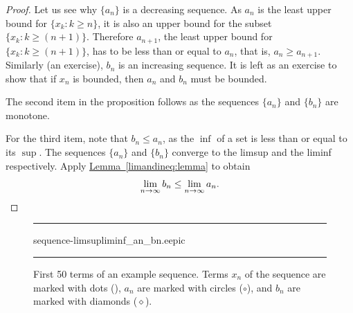 \documentclass[12pt]{book}
\newenvironment{myfigureht}{%
\begin{figure}[h!t]
\noindent\rule{\textwidth}{0.4pt}\vspace{12pt}\par\centering}%
{\par\noindent\rule{\textwidth}{0.4pt}
\end{figure}}
\newcommand{\N}{{\mathbb{N}}}
\theoremstyle{plain}
\theoremstyle{remark}
\theoremstyle{definition}
\theoremstyle{exercise}
\theoremstyle{example}
\newcommand{\lemmaref}[1]{\hyperref[#1]{Lemma~\ref*{#1}}}
\begin{document}
\begin{proof}
Let us see why $\{ a_n \}$ is a decreasing sequence.  As $a_n$ is the least upper
bound for $\{ x_k : k \geq n \}$, it is also
an upper bound for the subset $\{ x_k : k \geq (n+1) \}$.  Therefore
$a_{n+1}$, the least upper bound for
$\{ x_k : k \geq (n+1) \}$, has to be less than or equal to $a_n$,
that is,
$a_n \geq a_{n+1}$.  Similarly (an exercise), $b_n$ is an increasing
sequence.  It is left as an exercise to show that
if $x_n$ is bounded, then $a_n$ and $b_n$ must be bounded.

The second item in the proposition follows as the sequences
$\{ a_n \}$ and $\{ b_n \}$ are monotone.

For the third item, note that $b_n \leq a_n$, as the $\inf$ of a set
is less than or equal to its $\sup$.  The sequences $\{ a_n \}$ and $\{ b_n \}$
converge to the limsup and the liminf respectively.
Apply \lemmaref{limandineq:lemma} to obtain
\begin{equation*}
\lim_{n\to \infty} b_n \leq \lim_{n\to \infty} a_n.  \qedhere
\end{equation*}
\end{proof}
\begin{myfigureht}
{sequence-limsupliminf_an_bn.eepic}
\caption{First 50 terms of an example sequence.  Terms $x_n$ of the sequence are
marked with dots (\raisebox{0.25ex}{\tiny$\bullet$}), $a_n$ are marked with
circles ($\circ$), and
$b_n$ are marked with diamonds ($\diamond$).\label{sequence-limsupliminf_an_bn}}
\end{myfigureht}
\end{document}
